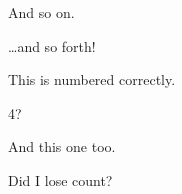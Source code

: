 \begin{questions}
\question And so on.
\begin{solution}
  \ldots{}and so forth!
\end{solution}



\question This is numbered correctly.
\begin{solution}
  4?
\end{solution}


\question And this one too.
\begin{solution}
  Did I lose count?
\end{solution}


\end{questions}

